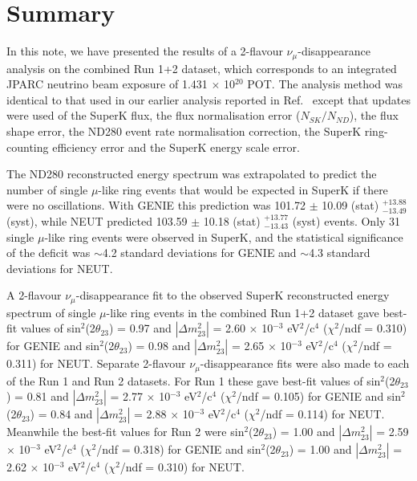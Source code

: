 \clearpage 

\section {Summary }
\label{sec:summary}

In this note, we have presented the results of a 2-flavour $\nu_{\mu}$-disappearance analysis 
on the combined Run 1+2 dataset, which corresponds to an integrated JPARC neutrino beam exposure 
of 1.431 $\times$ 10$^{20}$ POT. The analysis method was identical to that used in our earlier analysis
reported in Ref.\ \cite{OurRun1DisappAnalysis} except that updates were used of the SuperK flux, 
the flux normalisation error ($N_{SK}/N_{ND}$), the flux shape error, the ND280 event rate 
normalisation correction, the SuperK ring-counting efficiency error and the SuperK energy scale error.

The ND280 reconstructed energy spectrum was extrapolated to predict the number of single $\mu$-like 
ring events that would be expected in SuperK if there were no oscillations. With GENIE this prediction was 
101.72 $\pm$ 10.09 (stat) $^{+13.88}_{-13.49}$ (syst), while NEUT predicted 103.59 $\pm$ 10.18 (stat) 
$^{+13.77}_{-13.43}$ (syst) events. Only 31 single $\mu$-like ring events were observed in SuperK, 
and the statistical significance of the deficit was $\sim$4.2 standard deviations for GENIE and 
$\sim$4.3 standard deviations for NEUT. 

A 2-flavour $\nu_{\mu}$-disappearance fit to the observed SuperK reconstructed energy spectrum of 
single $\mu$-like ring events in the combined Run 1+2 dataset gave best-fit values of 
sin$^{2}$(2$\theta_{23}$) = 0.97 and $|\Delta m^{2}_{23}|$ = 2.60 $\times$ 10$^{-3}$ eV$^{2}$/c$^{4}$
($\chi^{2}$/ndf = 0.310) for GENIE and sin$^{2}$(2$\theta_{23}$) = 0.98 and $|\Delta m^{2}_{23}|$ 
= 2.65 $\times$ 10$^{-3}$ eV$^{2}$/c$^{4}$ ($\chi^{2}$/ndf = 0.311) for NEUT. Separate 2-flavour 
$\nu_{\mu}$-disappearance fits were also made to each of the Run 1 and Run 2 datasets. For Run 1
these gave best-fit values of sin$^{2}$(2$\theta_{23}$) = 0.81 and $|\Delta m^{2}_{23}|$ 
= 2.77 $\times$ 10$^{-3}$ eV$^{2}$/c$^{4}$ ($\chi^{2}$/ndf = 0.105) for GENIE and 
sin$^{2}$(2$\theta_{23}$) = 0.84 and $|\Delta m^{2}_{23}|$ = 2.88 $\times$ 10$^{-3}$ eV$^{2}$/c$^{4}$ 
($\chi^{2}$/ndf = 0.114) for NEUT. Meanwhile the best-fit values for Run 2 were 
sin$^{2}$(2$\theta_{23}$) = 1.00 and $|\Delta m^{2}_{23}|$ = 2.59 $\times$ 10$^{-3}$ eV$^{2}$/c$^{4}$ 
($\chi^{2}$/ndf = 0.318) for GENIE and sin$^{2}$(2$\theta_{23}$) = 1.00 and $|\Delta m^{2}_{23}|$ 
= 2.62 $\times$ 10$^{-3}$ eV$^{2}$/c$^{4}$ ($\chi^{2}$/ndf = 0.310) for NEUT.

